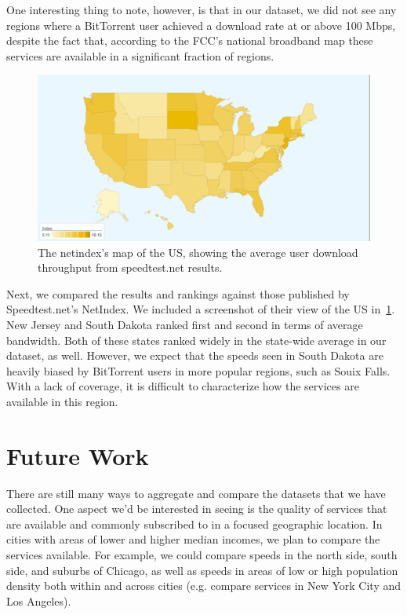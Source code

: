 \documentclass{sig-alternate-10pt}
\begin{document}
One interesting thing to note, however, is that in our dataset, we did not see
any regions where a BitTorrent user achieved a download rate at or above 100
Mbps, despite the fact that, according to the FCC's national broadband map
these services are available in a significant fraction of regions.

\begin{figure}
\centering
        \includegraphics[width=0.9\linewidth]{figs/map.pdf}
  \caption{The netindex's map of the US, showing the average 
user download throughput from speedtest.net results.}
  \label{fig:services-net-index-map}
\end{figure}

Next, we compared the results and rankings against those published by
Speedtest.net's NetIndex.  We included a screenshot of their view of the US
in~\ref{fig:services-net-index-map}. New Jersey and South Dakota ranked first
and second in terms of average bandwidth.  Both of these states ranked widely
in the state-wide average in our dataset, as well.  However, we expect that the
speeds seen in South Dakota are heavily biased by BitTorrent users in more
popular regions, such as Souix Falls. With a lack of coverage, it is difficult
to characterize how the services are available in this region.


\section{Future Work}
\label{sec:future-work} 

There are still many ways to aggregate and compare the datasets that we have
collected.  One aspect we'd be interested in seeing is the quality of services
that are available and commonly subscribed to in a focused geographic location.
In cities with areas of lower and higher median incomes, we plan to compare the
services available. For example, we could compare speeds in the north side,
south side, and suburbs of Chicago, as well as speeds in areas of low or high
population density both within and across cities (e.g. compare services in New
York City and Los Angeles).  
\end{document}
